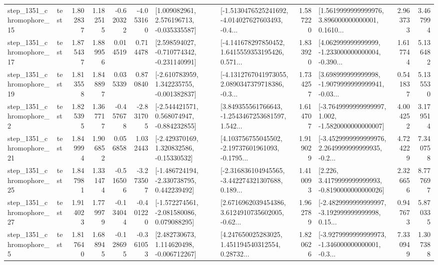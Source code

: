 \begin{tabular}{llrrrrllrlrr}
 step\_1351\_chromophore\_15 &      test &      1.802837 &    1.182515 &     -0.620322 & -4.053160 &    [1.009082961, 2.576196713, -0.035335587] &  [-1.5130476525241692, -4.014027627603493, -0.4... &       1.587220 &  [1.5619999999999976, 3.896000000000001, 0.1610... &            2.963733 &          3.467994 \\
 step\_1351\_chromophore\_17 &      test &      1.875437 &    1.889956 &      0.014519 &  0.714478 &   [2.598594027, -0.710774342, -0.231140991] &  [-4.141678297850452, 1.6415559353195426, 0.571... &       1.833920 &  [4.062999999999999, -1.233000000000004, -0.390... &            1.617744 &          5.136482 \\
 step\_1351\_chromophore\_19 &      test &      1.813558 &    1.848897 &      0.035339 &  0.870840 &   [-2.610783959, 1.342235755, -0.001382837] &  [-4.1312767041973055, 2.0890347379718386, -0.3... &       1.734257 &  [3.698999999999998, -1.9079999999999941, -0.03... &            0.541837 &          5.135530 \\
  step\_1351\_chromophore\_2 &      test &      1.825395 &    1.367717 &     -0.457678 & -2.831705 &   [-2.544421571, 0.568074947, -0.884232855] &  [3.849355561766643, -1.2543467253681597, 1.542... &       1.614707 &  [-3.7649999999999997, 1.002, -1.5820000000000007] &            4.004252 &          3.179514 \\
 step\_1351\_chromophore\_21 &      test &      1.849994 &    1.906852 &      0.056858 &  1.032443 &    [-2.429370169, 1.320832586, -0.15330532] &  [4.103756755045502, -2.19737601961093, -0.1795... &       1.919029 &  [-3.4529999999999976, 2.2649999999999935, -0.2... &            4.724229 &          7.340758 \\
 step\_1351\_chromophore\_25 &      test &      1.847981 &    1.331474 &     -0.516506 & -3.273507 &   [-1.486724194, -2.330738795, 0.442239492] &  [-2.316836104945565, -3.442274321307688, 0.189... &       1.410093 &   [2.226, 3.4179999999999993, -0.8190000000000026] &            2.326656 &          8.777697 \\
 step\_1351\_chromophore\_27 &      test &      1.914023 &    1.779979 &     -0.134044 & -0.401220 &   [-1.572274561, -2.081580086, 0.079088295] &  [2.6716962039454386, 3.6124910735602005, -0.62... &       1.962789 &  [-2.4829999999999997, -3.192999999999998, 0.15... &            0.947673 &          5.870335 \\
  step\_1351\_chromophore\_5 &      test &      1.817640 &    1.688945 &     -0.128695 & -0.361053 &    [2.482730673, 1.114620498, -0.006712267] &  [4.247650025283025, 1.451194540312554, 0.28732... &       1.820626 &  [-3.9279999999999973, -1.346000000000001, -0.3... &            7.330949 &          1.307388 \\

\end{tabular}
